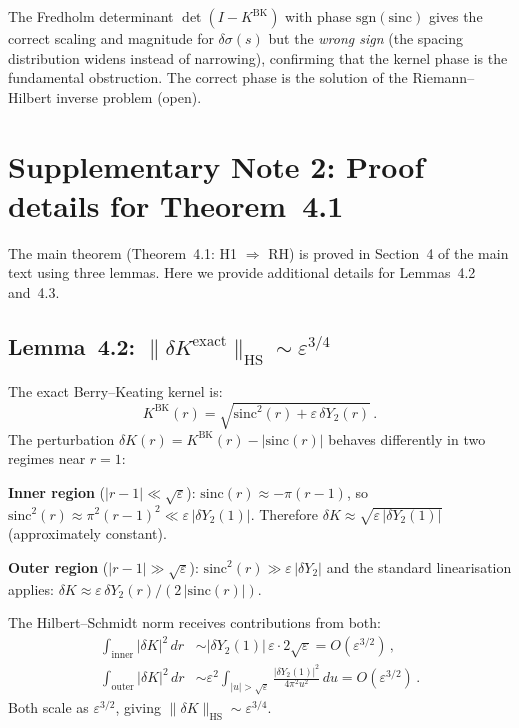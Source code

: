 \documentclass[10pt]{article}
\theoremstyle{remark}
\begin{document}
The Fredholm determinant $\det(I - K^{\mathrm{BK}})$ with phase
$\mathrm{sgn}(\mathrm{sinc})$ gives the correct scaling and magnitude for
$\delta\sigma(s)$ but the \emph{wrong sign} (the spacing distribution
widens instead of narrowing), confirming that the kernel phase is the
fundamental obstruction. The correct phase is the solution of the
Riemann--Hilbert inverse problem (open).


\section{Supplementary Note 2: Proof details for Theorem~4.1}

The main theorem (Theorem~4.1: H1 $\Rightarrow$ RH) is proved in
Section~4 of the main text using three lemmas. Here we provide
additional details for Lemmas~4.2 and~4.3.

\subsection{Lemma~4.2: $\|\delta K^{\mathrm{exact}}\|_{\mathrm{HS}}
\sim \varepsilon^{3/4}$}

The exact Berry--Keating kernel is:
\begin{equation}
K^{\mathrm{BK}}(r) = \sqrt{\mathrm{sinc}^2(r) + \varepsilon\,\delta Y_2(r)}\,.
\end{equation}
The perturbation $\delta K(r) = K^{\mathrm{BK}}(r) - |\mathrm{sinc}(r)|$
behaves differently in two regimes near $r = 1$:

\textbf{Inner region} ($|r - 1| \ll \sqrt{\varepsilon}$):
$\mathrm{sinc}(r) \approx -\pi(r-1)$, so
$\mathrm{sinc}^2(r) \approx \pi^2(r-1)^2 \ll \varepsilon\,|\delta Y_2(1)|$.
Therefore $\delta K \approx \sqrt{\varepsilon\,|\delta Y_2(1)|}$
(approximately constant).

\textbf{Outer region} ($|r - 1| \gg \sqrt{\varepsilon}$):
$\mathrm{sinc}^2(r) \gg \varepsilon\,|\delta Y_2|$ and the standard
linearisation applies:
$\delta K \approx \varepsilon\,\delta Y_2(r)/(2\,|\mathrm{sinc}(r)|)$.

The Hilbert--Schmidt norm receives contributions from both:
\begin{align}
\int_{\text{inner}} |\delta K|^2\,dr
&\sim |\delta Y_2(1)|\,\varepsilon \cdot 2\sqrt{\varepsilon}
= O(\varepsilon^{3/2})\,,\\
\int_{\text{outer}} |\delta K|^2\,dr
&\sim \varepsilon^2 \int_{|u| > \sqrt{\varepsilon}}
\frac{|\delta Y_2(1)|^2}{4\pi^2 u^2}\,du
= O(\varepsilon^{3/2})\,.
\end{align}
Both scale as $\varepsilon^{3/2}$, giving
$\|\delta K\|_{\mathrm{HS}} \sim \varepsilon^{3/4}$.
\end{document}

